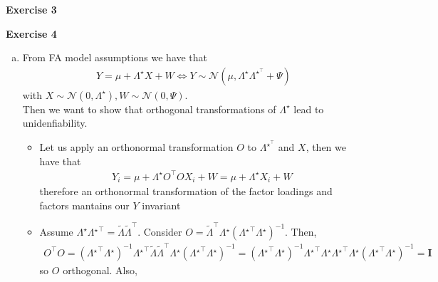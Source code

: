 \documentclass[10pt,notitlepage]{article}
\newcommand{\MBlue}[1]{{\color{MBlue}#1}}
\newcommand{\Id}{\mathbf{I}}
\begin{document}
    \newpage
    \textbf{\large \MBlue{Exercise 3}}
    \vskip10pt
    \noindent
	\begin{exercise}[Solution]
    \end{exercise}

    \newpage
    \textbf{\large \MBlue{Exercise 4}}
    \vskip10pt
    \noindent
	\begin{exercise}[Solution]
        \begin{enumerate}[(a)]
            \item From FA model assumptions we have that
                    \begin{align*}
                        Y = \mu + \Lambda^\star X + W \iff Y\sim\mathcal{N}(\mu, \Lambda^\star\Lambda^{\star^\top}+\Psi)
                    \end{align*}
                    with $X\sim\mathcal{N}(0,\Lambda^\star), W\sim\mathcal{N}(0,\Psi)$.\\
                    Then we want to show that orthogonal transformations of $\Lambda^\star$ lead to unidenfiability.
                    \begin{itemize}
                        \item Let us apply an orthonormal transformation $O$ to $\Lambda^{\star^\top}$ and $X$, then we have that
                                \begin{align*}
                                    Y_i = \mu + \Lambda^\star O^\top O X_i + W = \mu + \Lambda^\star X_i + W
                                \end{align*}
                                therefore an orthonormal transformation of the factor loadings and factors mantains our $Y$ invariant
                        \item Assume $\Lambda^\star \Lambda{^\star}^\top = \tilde{\Lambda} \tilde{\Lambda}^\top$. Consider $O = \tilde{\Lambda}^\top \Lambda{^\star} (\Lambda{^\star}^\top \Lambda{^\star})^{-1}$. Then, 
                                \begin{align*}
                                    O^\top O = \left(\Lambda{^\star}^\top \Lambda{^\star}\right)^{-1} \Lambda{^\star}^\top \tilde{\Lambda} \tilde{\Lambda}^\top \Lambda{^\star}\left(\Lambda{^\star}^\top \Lambda{^\star}\right)^{-1} = \left(\Lambda{^\star}^\top \Lambda{^\star}\right)^{-1} \Lambda{^\star}^\top \Lambda{^\star}\Lambda{^\star}^\top \Lambda{^\star}\left(\Lambda{^\star}^\top \Lambda{^\star}\right)^{-1}  = \Id
                                \end{align*}
                                so $O$ orthogonal. Also, 

\end{itemize}
\end{enumerate}
\end{exercise}
\end{document}
